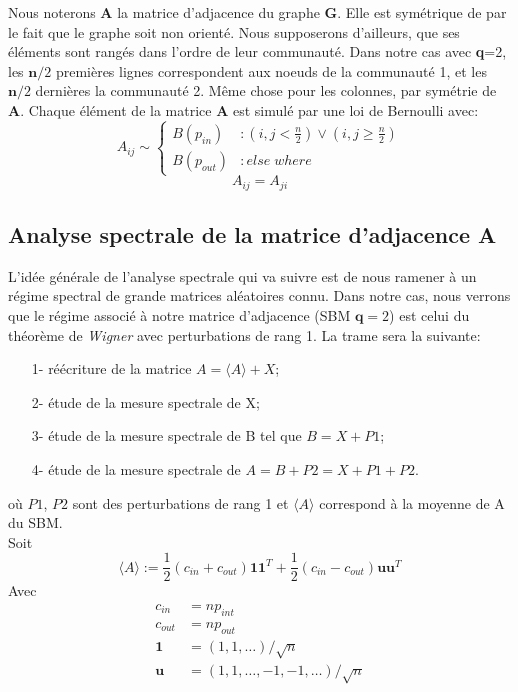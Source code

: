 Nous noterons \textbf{A} la matrice d'adjacence du graphe \textbf{G}.
Elle est symétrique de par le fait que le graphe soit non orienté.
Nous supposerons d'ailleurs, que ses éléments sont rangés dans l'ordre de leur communauté.
Dans notre cas avec \textbf{q}=2, les $\mathbf{n}/2$ premières lignes correspondent aux noeuds de la communauté 1, et les $\mathbf{n}/2$ dernières la communauté 2.
Même chose pour les colonnes, par symétrie de \textbf{A}.
Chaque élément de la matrice \textbf{A} est simulé par une loi de Bernoulli avec: 
\begin{equation} 
 A_{ij} \sim \left\{
  \begin{array}{lr}
    B(p_{in}) & : (i,j < \frac{n}{2}) \lor (i,j \ge \frac{n}{2}) \\
    B(p_{out}) & : else \; where
  \end{array}
\right.\nonumber
\end{equation}
\begin{equation} 
A_{ij} = A_{ji}\nonumber
\end{equation}


\subsection{Analyse spectrale de la matrice d'adjacence \textbf{A}}
L'idée générale de l'analyse spectrale qui va suivre est de nous ramener à un régime spectral de grande matrices aléatoires connu. 
Dans notre cas, nous verrons que le régime associé à notre matrice d'adjacence (SBM $\textbf{q}=2$) est celui du théorème de \textit{Wigner} avec perturbations de rang 1.
La trame sera la suivante:
\begin{itemize}
 	\item[1-] réécriture de la matrice $A = \langle A \rangle + X$;
 	\item[2-] étude de la mesure spectrale de X;
 	\item[3-] étude de la mesure spectrale de B tel que $B = X + P1$;
 	\item[4-] étude de la mesure spectrale de $A = B + P2 = X + P1 + P2$.
 \end{itemize} 
où $P1$, $P2$ sont des perturbations de rang 1 et $\langle A \rangle$ correspond à la moyenne de A du SBM.\\

Soit
\begin{equation} 
\langle A \rangle := \frac{1}{2}(c_{in} + c_{out})\mathbf{11}^T + \frac{1}{2}(c_{in} - c_{out})\mathbf{uu}^T \label{eq:1}
\end{equation}
Avec
\begin{align*}
c_{in} &= np_{int} \\
c_{out} &= np_{out}\\
\mathbf{1} &= (1, 1, \ldots)/\sqrt{n}\\
\mathbf{u} &= (1, 1, \ldots, -1, -1, \ldots)/\sqrt{n}
\end{align*}

